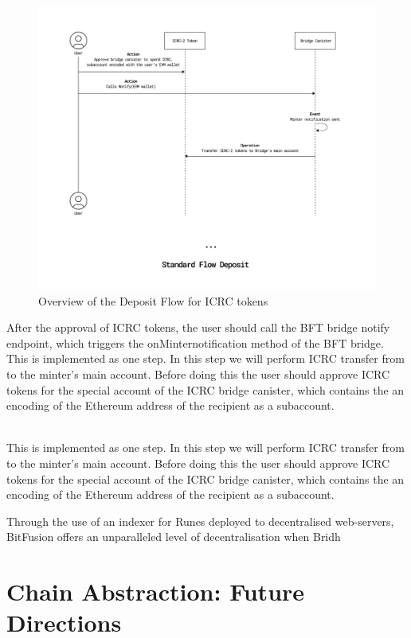     \begin{figure}[H]
        \centering
        \includegraphics[width=1\textwidth]{icrc.png}
        \caption{Overview of the Deposit Flow for ICRC tokens}
        \label{fig:icrc}
    \end{figure}

After the approval of ICRC tokens, the user should call the BFT bridge notify endpoint, which triggers the onMinternotification method of the BFT bridge. 
\\
This is implemented as one step. In this step we will perform ICRC transfer from to the minter's main account. Before doing this the user should approve ICRC tokens for the special account of the ICRC bridge canister, which contains the an encoding of the Ethereum address of the recipient as a subaccount. 

\\
This is implemented as one step. In this step we will perform ICRC transfer from to the minter's main account. Before doing this the user should approve ICRC tokens for the special account of the ICRC bridge canister, which contains the an encoding of the Ethereum address of the recipient as a subaccount.


Through the use of an indexer for Runes deployed to decentralised web-servers, BitFusion offers an unparalleled level of decentralisation when Bridh



\section{Chain Abstraction: Future Directions}


